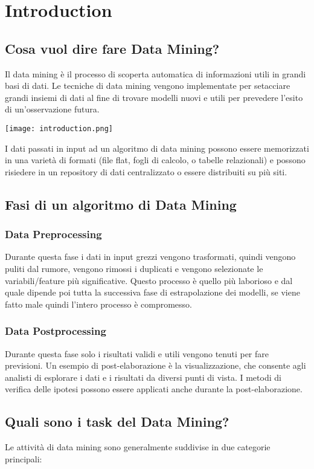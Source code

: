 \chapter{Introduction}
\section{Cosa vuol dire fare Data Mining?}

  Il data mining è il processo di scoperta automatica di informazioni utili in grandi basi di dati. Le tecniche di data mining vengono implementate per setacciare grandi insiemi di dati al fine di trovare modelli nuovi e utili per prevedere l'esito di un'osservazione futura.

  \texttt{[image: introduction.png]}

  I dati passati in input ad un algoritmo di data mining possono essere memorizzati in una varietà di formati (file flat, fogli di calcolo,
  o tabelle relazionali) e possono risiedere in un repository di dati centralizzato o essere
  distribuiti su più siti. 

\section{Fasi di un algoritmo di Data Mining}
  \subsection*{Data Preprocessing}
    Durante questa fase i dati in input grezzi vengono trasformati, quindi vengono puliti dal rumore, vengono rimossi i duplicati
    e vengono selezionate le variabili/feature più significative. Questo processo è quello più laborioso e dal quale dipende
    poi tutta la successiva fase di estrapolazione dei modelli, se viene fatto male quindi l'intero processo è compromesso.

  \subsection*{Data Postprocessing}
    Durante questa fase solo i risultati validi e utili vengono tenuti per fare previsioni.
    Un esempio di post-elaborazione è la visualizzazione, che consente agli analisti di esplorare i dati e i risultati da diversi punti di vista.
    I metodi di verifica delle ipotesi possono essere applicati anche durante la post-elaborazione.

\section{Quali sono i task del Data Mining?}
  Le attività di data mining sono generalmente suddivise in due categorie principali:

